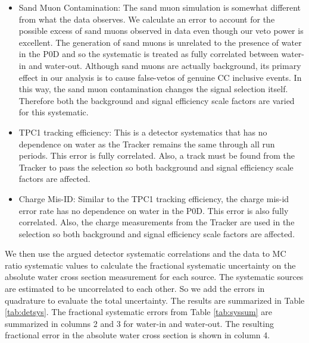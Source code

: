 \begin{itemize}
\item Sand Muon Contamination: The sand muon simulation is somewhat different from what the data observes. We calculate an error to account for the possible excess of sand muons observed in data even though our veto power is excellent. The generation of sand muons is unrelated to the presence of water in the P0D and so the systematic is treated as fully correlated between water-in and water-out. Although sand muons are actually background, its primary effect in our analysis is to cause false-vetos of genuine CC inclusive events. In this way, the sand muon contamination changes the signal selection itself. Therefore both the background and signal efficiency scale factors are varied for this systematic.
\item TPC1 tracking efficiency: This is a detector systematics that has no dependence on water as the Tracker remains the same through all run periods. This error is fully correlated. Also, a track must be found from the Tracker to pass the selection so both background and signal efficiency scale factors are affected.
\item Charge Mis-ID: Similar to the TPC1 tracking efficiency, the charge mis-id error rate has no dependence on water in the P0D. This error is also fully correlated. Also, the charge measurements from the Tracker are used in the selection so both background and signal efficiency scale factors are affected.

\end{itemize}

We then use the argued detector systematic correlations and the data to MC ratio systematic values to calculate the fractional systematic uncertainty on the absolute water cross section measurement for each source. The systematic sources are estimated to be uncorrelated to each other. So we add the errors in quadrature to evaluate the total uncertainty. The results are summarized in Table \ref{tab:detsys}. The fractional systematic errors from Table \ref{tab:syssum} are summarized in columns 2 and 3 for water-in and water-out. The resulting fractional error in the absolute water cross section is shown in column 4.

